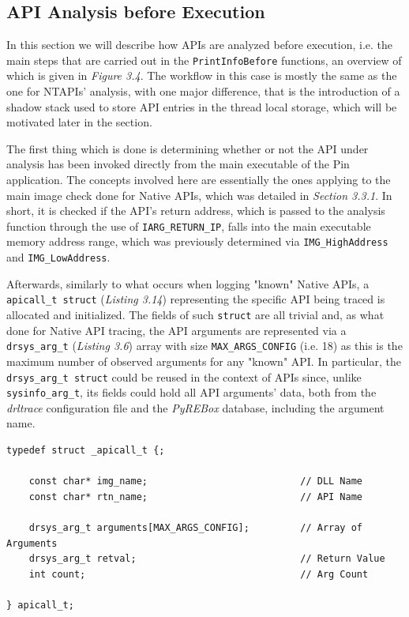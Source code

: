 \subsection{API Analysis before Execution}

In this section we will describe how APIs are analyzed before execution, i.e. the main steps that are carried out in the \texttt{PrintInfoBefore} functions, an overview of which is given in \textit{Figure 3.4}.
The workflow in this case is mostly the same as the one for NTAPIs' analysis, with one major difference, that is the introduction of a shadow stack used to store API entries in the thread local storage, which will be motivated later in the section.

The first thing which is done is determining whether or not the API under analysis has been invoked directly from the main executable of the Pin application. The concepts involved here are essentially the ones applying to the main image check done for Native APIs, which was detailed in \textit{Section 3.3.1}. In short, it is checked if the API's return address, which is passed to the analysis function through the use of \texttt{IARG\_RETURN\_IP}, falls into the main executable memory address range, which was previously determined via \texttt{IMG\_HighAddress} and \texttt{IMG\_LowAddress}.

Afterwards, similarly to what occurs when logging "known" Native APIs, a \texttt{apicall\_t struct} (\textit{Listing 3.14}) representing the specific API being traced is allocated and initialized. The fields of such \texttt{struct} are all trivial and, as what done for Native API tracing, the API arguments are represented via a \texttt{drsys\_arg\_t} (\textit{Listing 3.6}) array with size \texttt{MAX\_ARGS\_CONFIG} (i.e. 18) as this is the maximum number of observed arguments for any "known" API. In particular, the \texttt{drsys\_arg\_t struct} could be reused in the context of APIs since, unlike \texttt{sysinfo\_arg\_t}, its fields could hold all API arguments' data, both from the \textit{drltrace} configuration file and the \textit{PyREBox} database, including the argument name. 
\\
\begin{lstlisting}[caption={\texttt{struct} representing the API being traced},captionpos=b]
typedef struct _apicall_t {;

	const char* img_name;							// DLL Name
	const char* rtn_name;							// API Name

	drsys_arg_t arguments[MAX_ARGS_CONFIG];			// Array of Arguments
	drsys_arg_t retval;								// Return Value
	int count;										// Arg Count

} apicall_t;
\end{lstlisting}

